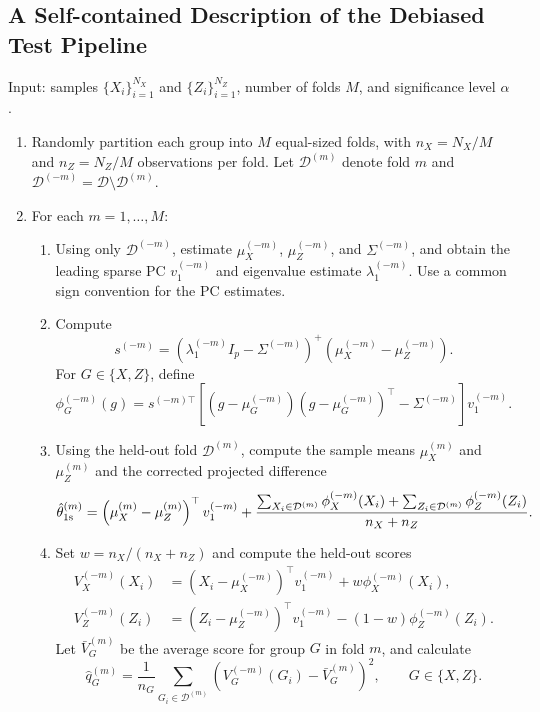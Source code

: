 \documentclass[11pt]{article}
\newenvironment{revblock}
  {\color{teal}}
  {}
\begin{document}
\begin{revblock}
\subsection{A Self-contained Description of the Debiased Test Pipeline}

\noindent
Input: samples $\{X_i\}_{i=1}^{N_X}$ and $\{Z_i\}_{i=1}^{N_Z}$,
number of folds $M$, and significance level $\alpha$.

\begin{enumerate}
\item Randomly partition each group into $M$ equal-sized folds,
with $n_X=N_X/M$ and $n_Z=N_Z/M$ observations per fold.
Let $\mathcal D^{(m)}$ denote fold $m$ and
$\mathcal D^{(-m)}=\mathcal D\setminus\mathcal D^{(m)}$.

\item For each $m=1,\ldots,M$:
\begin{enumerate}
\item Using only $\mathcal D^{(-m)}$, estimate
$\mu_X^{(-m)}$, $\mu_Z^{(-m)}$, and $\Sigma^{(-m)}$,
and obtain the leading sparse PC $v_1^{(-m)}$ and
eigenvalue estimate $\lambda_1^{(-m)}$. Use a common sign convention for the PC estimates.

\item Compute
\[
s^{(-m)}
=
\left(\lambda_1^{(-m)}I_p-\Sigma^{(-m)}\right)^+
\left(\mu_X^{(-m)}-\mu_Z^{(-m)}\right).
\]
For $G\in\{X,Z\}$, define
\[
\phi_G^{(-m)}(g)
=
s^{(-m)\top}
\left[
(g-\mu_G^{(-m)})(g-\mu_G^{(-m)})^\top
-\Sigma^{(-m)}
\right]v_1^{(-m)}.
\]

\item Using the held-out fold $\mathcal D^{(m)}$, compute
the sample means $\mu_X^{(m)}$ and $\mu_Z^{(m)}$ and
the corrected projected difference
\[
\hat\theta_{\rm 1s}^{(m)}
=
\left(\mu_X^{(m)}-\mu_Z^{(m)}\right)^\top v_1^{(-m)}
+
\frac{
\sum_{X_i\in\mathcal D^{(m)}}\phi_X^{(-m)}(X_i)
+
\sum_{Z_i\in\mathcal D^{(m)}}\phi_Z^{(-m)}(Z_i)
}{n_X+n_Z}.
\]

\item Set $w=n_X/(n_X+n_Z)$ and compute the held-out scores
\[
\begin{aligned}
V_X^{(-m)}(X_i)
&=(X_i-\mu_X^{(-m)})^\top v_1^{(-m)}
+w\phi_X^{(-m)}(X_i),\\
V_Z^{(-m)}(Z_i)
&=(Z_i-\mu_Z^{(-m)})^\top v_1^{(-m)}
-(1-w)\phi_Z^{(-m)}(Z_i).
\end{aligned}
\]
Let $\bar V_G^{(m)}$ be the average score for group $G$
in fold $m$, and calculate
\[
\hat q_G^{(m)}
=
\frac{1}{n_G}
\sum_{G_i\in\mathcal D^{(m)}}
\left(V_G^{(-m)}(G_i)-\bar V_G^{(m)}\right)^2,
\qquad G\in\{X,Z\}.
\]
\end{enumerate}


\end{enumerate}
\end{revblock}
\end{document}
